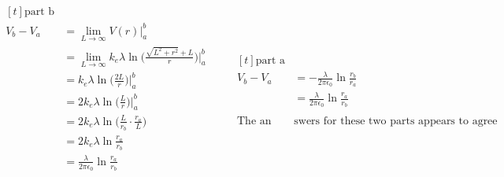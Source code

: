 \documentclass[11pt]{article}
\begin{document}
\begin{align*}
\begin{aligned}[t]
\text{part b} \\
V_b - V_a &= \lim_{L \to \infty} V(r) \big|_a^b \\
          &= \lim_{L \to \infty} k_e \lambda \ln \bigg( \frac{ \sqrt{L^2 + r^2} + L }{r} \bigg) \bigg|_a^b\\
          &= k_e \lambda \ln \bigg( \frac{2L}{r} \bigg) \bigg|_a^b\\
          &= 2k_e \lambda \ln \bigg( \frac{L}{r} \bigg) \bigg|_a^b\\
          &= 2k_e \lambda \ln \bigg( \frac{L}{r_b} \cdot \frac{r_a}{L} \bigg) \\
          &= 2k_e \lambda \ln \frac{r_a}{r_b} \\
          &= \frac{\lambda}{2 \pi \epsilon_0} \ln \frac{r_a}{r_b} \\
\end{aligned}
\qquad
\begin{aligned}[t]
\text{part a} \\
V_b - V_a &= - \frac{\lambda}{2 \pi \epsilon_0} \ln{\frac{r_{b}}{r_a}} \\
          &= \frac{\lambda}{2 \pi \epsilon_0} \ln \frac{r_a}{r_b} \\
\\
\text{The an}& \text{swers for these two parts appears to agree}
\end{aligned}
\end{align*}
\end{document}
